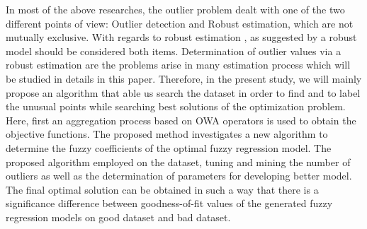 \documentclass{IJFS}
\begin{document}
In most of the above researches, the outlier problem dealt with one of the two different points of view: Outlier detection and Robust estimation, which are not mutually exclusive.
With regards to robust estimation \cite{Hub09}, as suggested by \cite{Dur11} a robust model should be considered both items.
Determination of outlier values via a robust estimation are the problems arise in many estimation process which will be studied in details in this paper.
Therefore, in the present study, we will mainly propose an algorithm that able us search the dataset in order to find and to label the unusual points while searching best solutions of the optimization problem.
Here, first an aggregation process based on OWA operators \cite{Yag88} is used to obtain the objective functions.
The proposed method investigates a new algorithm to determine  the fuzzy coefficients of the optimal fuzzy regression model.
The  proposed algorithm employed on the dataset, tuning and mining the number of outliers as well as the determination of parameters for developing better model.
The final optimal solution can be obtained in such a way that there is a significance difference between goodness-of-fit values of the generated fuzzy regression models on good dataset and bad dataset.
\end{document}
